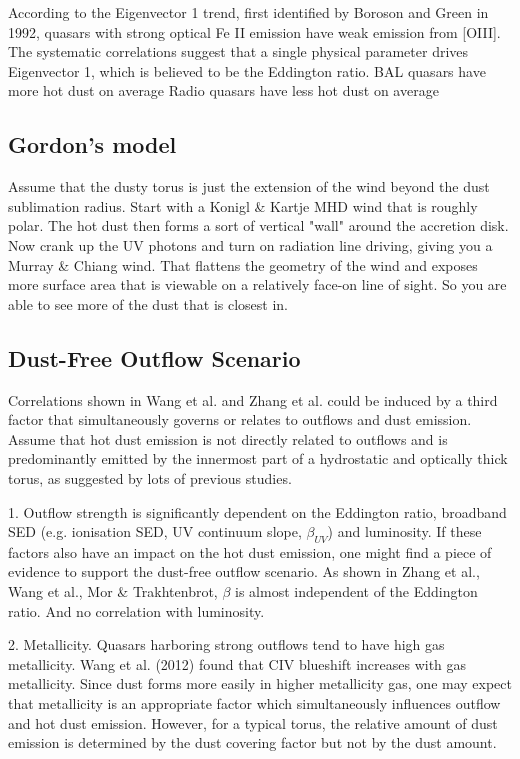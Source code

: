 According to the Eigenvector 1 trend, first identified by Boroson and Green in 1992, quasars with strong optical Fe II emission have weak emission from [OIII]. 
The systematic correlations suggest that a single physical parameter drives Eigenvector 1, which is believed to be the Eddington ratio. 
BAL quasars have more hot dust on average
Radio quasars have less hot dust on average

\subsection{Gordon's model}

Assume that the dusty torus is just the extension of the wind beyond the dust sublimation radius.  
Start with a Konigl \& Kartje MHD wind that is roughly polar.  
The hot dust then forms a sort of vertical "wall" around the accretion disk.  
Now crank up the UV photons and turn on radiation line driving, giving you a Murray \& Chiang wind. 
That flattens the geometry of the wind and exposes more surface area that is viewable on a relatively face-on line of sight.  
So you are able to see more of the dust that is closest in.

\subsection{Dust-Free Outflow Scenario}

Correlations shown in Wang et al. and Zhang et al. could be induced by a third factor that simultaneously governs or relates to outflows and dust emission. 
Assume that hot dust emission is not directly related to outflows and is predominantly emitted by the innermost part of a hydrostatic and optically thick torus, as suggested by lots of previous studies.

1. Outflow strength is significantly dependent on the Eddington ratio, broadband SED (e.g. ionisation SED, UV continuum slope, $\beta_{UV}$) and luminosity. 
If these factors also have an impact on the hot dust emission, one might find a piece of evidence to support the dust-free outflow scenario. 
As shown in Zhang et al., Wang et al., Mor \& Trakhtenbrot, $\beta$ is almost independent of the Eddington ratio. And no correlation with luminosity. 

2. Metallicity. Quasars harboring strong outflows tend to have high gas metallicity. 
Wang et al. (2012) found that CIV blueshift increases with gas metallicity. 
Since dust forms more easily in higher metallicity gas, one may expect that metallicity is an appropriate factor which simultaneously influences outflow and hot dust emission. 
However, for a typical torus, the relative amount of dust emission is determined by the dust covering factor but not by the dust amount. 

